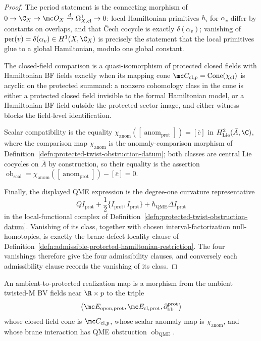 \begin{proof}
  The period statement is the connecting morphism of
  \(0\to\C_X\to\mc O_X\xrightarrow d\Omega^1_{X,\mathrm{cl}}\to0\):
  local Hamiltonian primitives \(h_i\) for \(\alpha_v\) differ by
  constants on overlaps, and that \v{C}ech cocycle is exactly
  \(\delta(\alpha_v)\); vanishing of
  \(\operatorname{per}(v)=\delta(\alpha_v)\in H^1(X,\C_X)\) is
  precisely the statement that the local primitives glue to a global
  Hamiltonian, modulo one global constant.

  The closed-field comparison is a quasi-isomorphism of protected
  closed fields with Hamiltonian BF fields exactly when its mapping
  cone \(\mc C_{\mathrm{cl},p}=\operatorname{Cone}(\chi_{\mathrm{cl}})\)
  is acyclic on the protected summand: a nonzero cohomology class in
  the cone is either a protected closed field invisible to the
  formal Hamiltonian model, or a Hamiltonian BF field outside the
  protected-sector image, and either witness blocks the field-level
  identification.

  Scalar compatibility is the equality
  \(\chi_{\mathrm{anom}}([\operatorname{anom}_{\mathrm{prot}}])=[\bar c]\)
  in \(H^2_{\mathrm{Lie}}(\bar A,\C)\), where the comparison map
  \(\chi_{\mathrm{anom}}\) is the anomaly-comparison morphism of
  Definition~\ref{defn:protected-twist-obstruction-datum}; both
  classes are central Lie cocycles on \(\bar A\) by construction, so
  their equality is the assertion
  \(\operatorname{ob}_{\mathrm{scal}}=
  \chi_{\mathrm{anom}}([\operatorname{anom}_{\mathrm{prot}}])-[\bar c]=0\).

  Finally, the displayed QME expression is the degree-one curvature
  representative
  \[
    QI_{\mathrm{prot}}
    +\frac12\{I_{\mathrm{prot}},I_{\mathrm{prot}}\}
    +\hbar_{\mathrm{QME}}\Delta I_{\mathrm{prot}}
  \]
  in the local-functional complex of
  Definition~\ref{defn:protected-twist-obstruction-datum}.  Vanishing of
  its class, together with chosen interval-factorization
  null-homotopies, is exactly the brane-defect locality clause of
  Definition~\ref{defn:admissible-protected-hamiltonian-restriction}.
  The four vanishings therefore give the four admissibility
  clauses, and conversely each admissibility clause records the
  vanishing of its class.
\end{proof}

\begin{defn}\label{defn:ambient-protected-realization-map}
  An ambient-to-protected realization map is a morphism from the ambient
  twisted-M BV fields near \(\R\times p\) to the triple
  \[
    \bigl(
      \mc E_{\mathrm{open},\mathrm{prot}},
      \mc E_{\mathrm{cl},\mathrm{prot}},
      \partial_{\mathrm{bb}}^{\mathrm{prot}}
    \bigr)
  \]
  whose closed-field cone is \(\mc C_{\mathrm{cl},p}\), whose scalar
  anomaly map is \(\chi_{\mathrm{anom}}\), and whose brane interaction
  has QME obstruction \(\operatorname{ob}_{\mathrm{QME}}\).
\end{defn}

